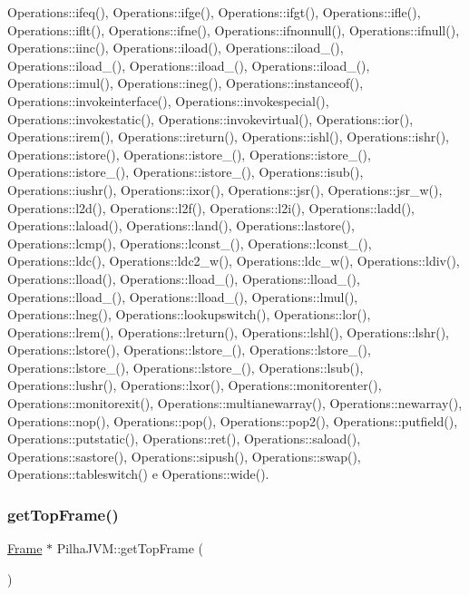 Operations\+::ifeq(), Operations\+::ifge(), Operations\+::ifgt(), Operations\+::ifle(), Operations\+::iflt(), Operations\+::ifne(), Operations\+::ifnonnull(), Operations\+::ifnull(), Operations\+::iinc(), Operations\+::iload(), Operations\+::iload\+\_(), Operations\+::iload\+\_(), Operations\+::iload\+\_(), Operations\+::iload\+\_(), Operations\+::imul(), Operations\+::ineg(), Operations\+::instanceof(), Operations\+::invokeinterface(), Operations\+::invokespecial(), Operations\+::invokestatic(), Operations\+::invokevirtual(), Operations\+::ior(), Operations\+::irem(), Operations\+::ireturn(), Operations\+::ishl(), Operations\+::ishr(), Operations\+::istore(), Operations\+::istore\+\_(), Operations\+::istore\+\_(), Operations\+::istore\+\_(), Operations\+::istore\+\_(), Operations\+::isub(), Operations\+::iushr(), Operations\+::ixor(), Operations\+::jsr(), Operations\+::jsr\+\_\+w(), Operations\+::l2d(), Operations\+::l2f(), Operations\+::l2i(), Operations\+::ladd(), Operations\+::laload(), Operations\+::land(), Operations\+::lastore(), Operations\+::lcmp(), Operations\+::lconst\+\_(), Operations\+::lconst\+\_(), Operations\+::ldc(), Operations\+::ldc2\+\_\+w(), Operations\+::ldc\+\_\+w(), Operations\+::ldiv(), Operations\+::lload(), Operations\+::lload\+\_(), Operations\+::lload\+\_(), Operations\+::lload\+\_(), Operations\+::lload\+\_(), Operations\+::lmul(), Operations\+::lneg(), Operations\+::lookupswitch(), Operations\+::lor(), Operations\+::lrem(), Operations\+::lreturn(), Operations\+::lshl(), Operations\+::lshr(), Operations\+::lstore(), Operations\+::lstore\+\_(), Operations\+::lstore\+\_(), Operations\+::lstore\+\_(), Operations\+::lstore\+\_(), Operations\+::lsub(), Operations\+::lushr(), Operations\+::lxor(), Operations\+::monitorenter(), Operations\+::monitorexit(), Operations\+::multianewarray(), Operations\+::newarray(), Operations\+::nop(), Operations\+::pop(), Operations\+::pop2(), Operations\+::putfield(), Operations\+::putstatic(), Operations\+::ret(), Operations\+::saload(), Operations\+::sastore(), Operations\+::sipush(), Operations\+::swap(), Operations\+::tableswitch() e Operations\+::wide().

\mbox{\label{classPilhaJVM_aa0e43da476df6147c86c8cc3d6899718}} 
\subsubsection{\texorpdfstring{get\+Top\+Frame()}{getTopFrame()}}
{\footnotesize\ttfamily \hyperlink{classFrame}{Frame} $\ast$ Pilha\+J\+V\+M\+::get\+Top\+Frame (\begin{DoxyParamCaption}{ }\end{DoxyParamCaption})}



